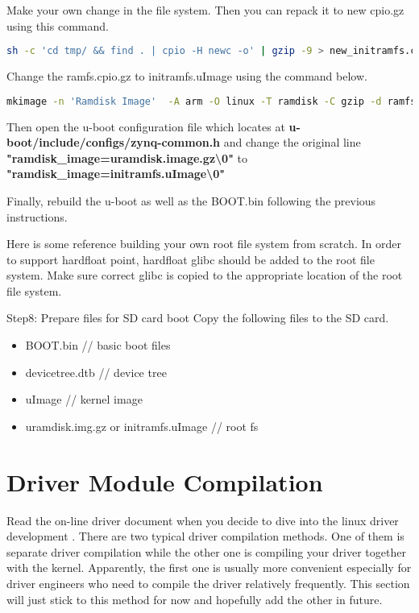 \documentclass[12pt]{article} %
\begin{document}
Make your own change in the file system. Then you can repack it to new cpio.gz using this command.
\begin{lstlisting}[language=bash]
sh -c 'cd tmp/ && find . | cpio -H newc -o' | gzip -9 > new_initramfs.cpio.gz
\end{lstlisting}

Change the ramfs.cpio.gz to initramfs.uImage using the command below.
\begin{lstlisting}[language=bash]
mkimage -n 'Ramdisk Image'  -A arm -O linux -T ramdisk -C gzip -d ramfs.cpio.gz initramfs.uImage
\end{lstlisting}

Then open the u-boot configuration file which locates at \textbf{u-boot/include/configs/zynq-common.h}
and change the original line \textbf{"ramdisk\_image=uramdisk.image.gz\textbackslash0"} to 
\textbf{"ramdisk\_image=initramfs.uImage\textbackslash 0"}

Finally, rebuild the u-boot as well as the BOOT.bin following the previous instructions.

Here is some reference \cite{busybox-ref1, busybox-ref2} building your own root file system from scratch.
In order to support hardfloat point, hardfloat glibc should be added to the root file system. Make sure 
correct glibc is copied to the appropriate location of the root file system.

Step8: Prepare files for SD card boot
Copy the following files to the SD card.
\begin{itemize}
    \item BOOT.bin // basic boot files
    \item devicetree.dtb // device tree
    \item uImage // kernel image
    \item uramdisk.img.gz or initramfs.uImage // root fs
\end{itemize}

\section{Driver Module Compilation}
Read the on-line driver document when you decide to dive into the linux driver development \cite{driver-doc}.
There are two typical driver compilation methods.
One of them is separate driver compilation while the other one is compiling your 
driver together with the kernel. Apparently, the first one is usually more convenient especially for 
driver engineers who need to compile the driver relatively frequently. This section will just stick to 
this method for now and hopefully add the other in future.
\end{document}
